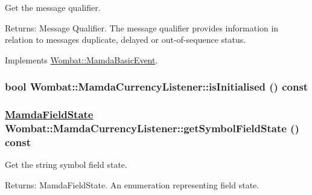 Get the message qualifier. 

\begin{Desc}
\item[Returns:]Message Qualifier. The message qualifier provides information in relation to messages duplicate, delayed or out-of-sequence status. \end{Desc}


Implements \hyperlink{classWombat_1_1MamdaBasicEvent_675ce8f1de581548426335423d6b3864}{Wombat::Mamda\-Basic\-Event}.\hypertarget{classWombat_1_1MamdaCurrencyListener_33eb7435735c7a88d240714973a1f6a6}{
\subsubsection[isInitialised]{\setlength{\rightskip}{0pt plus 5cm}bool Wombat::Mamda\-Currency\-Listener::is\-Initialised () const}}
\label{classWombat_1_1MamdaCurrencyListener_33eb7435735c7a88d240714973a1f6a6}


\hypertarget{classWombat_1_1MamdaCurrencyListener_80336ebcd54d9fdb027c620335529f1a}{
\subsubsection[getSymbolFieldState]{\setlength{\rightskip}{0pt plus 5cm}\hyperlink{namespaceWombat_93aac974f2ab713554fd12a1fa3b7d2a}{Mamda\-Field\-State} Wombat::Mamda\-Currency\-Listener::get\-Symbol\-Field\-State () const}}
\label{classWombat_1_1MamdaCurrencyListener_80336ebcd54d9fdb027c620335529f1a}


Get the string symbol field state. 

\begin{Desc}
\item[Returns:]Mamda\-Field\-State. An enumeration representing field state. \end{Desc}


